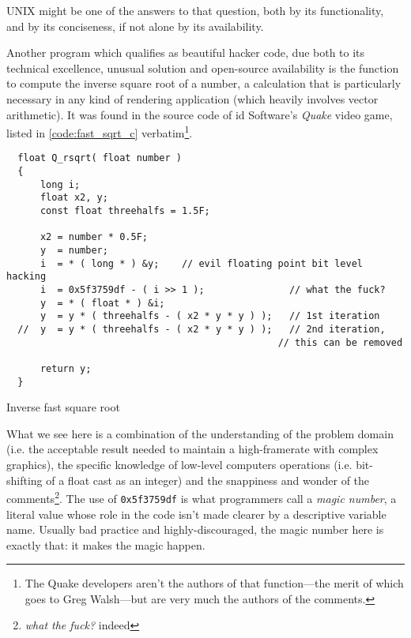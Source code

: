 UNIX might be one of the answers to that question, both by its functionality, and by its conciseness, if not alone by its availability.

Another program which qualifies as beautiful hacker code, due both to its technical excellence, unusual solution and open-source availability is the function to compute the inverse square root of a number, a calculation that is particularly necessary in any kind of rendering application (which heavily involves vector arithmetic). It was found in the source code of id Software's \emph{Quake} video game, listed in \ref{code:fast_sqrt_c} verbatim\footnote{The Quake developers aren't the authors of that function—the merit of which goes to Greg Walsh—but are very much the authors of the comments.}.

\pagebreak

\begin{listing}
  \begin{verbatim}
  float Q_rsqrt( float number )
  {
      long i;
      float x2, y;
      const float threehalfs = 1.5F;

      x2 = number * 0.5F;
      y  = number;
      i  = * ( long * ) &y;    // evil floating point bit level hacking
      i  = 0x5f3759df - ( i >> 1 );               // what the fuck? 
      y  = * ( float * ) &i;
      y  = y * ( threehalfs - ( x2 * y * y ) );   // 1st iteration
  //  y  = y * ( threehalfs - ( x2 * y * y ) );   // 2nd iteration,
                                                // this can be removed

      return y;
  }
\end{verbatim}
  \caption{Inverse fast square root}
  \label{code:fast_sqrt_c}
\end{listing}

What we see here is a combination of the understanding of the problem domain (i.e. the acceptable result needed to maintain a high-framerate with complex graphics), the specific knowledge of low-level computers operations (i.e. bit-shifting of a float cast as an integer) and the snappiness and wonder of the comments\footnote{\emph{what the fuck?} indeed}. The use of \lstinline{0x5f3759df} is what programmers call a \emph{magic number}, a literal value whose role in the code isn't made clearer by a descriptive variable name. Usually bad practice and highly-discouraged, the magic number here is exactly that: it makes the magic happen.

